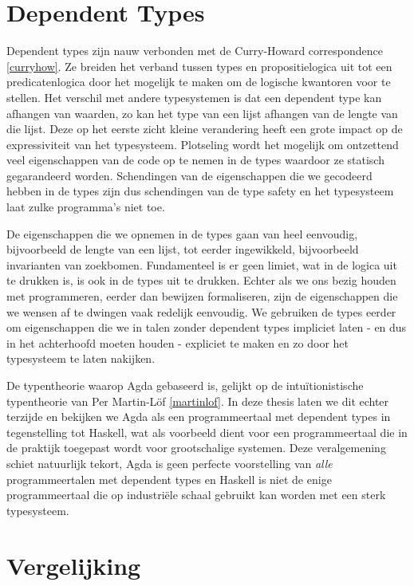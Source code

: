 \section{Dependent Types}

Dependent types zijn nauw verbonden met de Curry-Howard correspondence
\ref{curryhow}. Ze breiden het verband tussen types en propositielogica uit tot
een predicatenlogica door het mogelijk te maken om de logische kwantoren voor
te stellen. Het verschil met andere typesystemen is dat een dependent type kan
afhangen van waarden, zo kan het type van een lijst afhangen van de lengte van
die lijst. Deze op het eerste zicht kleine verandering heeft een grote impact
op de expressiviteit van het typesysteem. Plotseling wordt het mogelijk om
ontzettend veel eigenschappen van de code op te nemen in de types waardoor ze
statisch gegarandeerd worden. Schendingen van de eigenschappen die we gecodeerd
hebben in de types zijn dus schendingen van de type safety en het typesysteem
laat zulke programma's niet toe.

De eigenschappen die we opnemen in de types gaan van heel eenvoudig,
bijvoorbeeld de lengte van een lijst, tot eerder ingewikkeld, bijvoorbeeld
invarianten van zoekbomen. Fundamenteel is er geen limiet, wat in de logica uit
te drukken is, is ook in de types uit te drukken. Echter als we ons bezig
houden met programmeren, eerder dan bewijzen formaliseren, zijn de
eigenschappen die we wensen af te dwingen vaak redelijk eenvoudig. We gebruiken
de types eerder om eigenschappen die we in talen zonder dependent types
impliciet laten - en dus in het achterhoofd moeten houden - expliciet te maken
en zo door het typesysteem te laten nakijken.

De typentheorie waarop Agda gebaseerd is, gelijkt op de intuïtionistische
typentheorie van Per Martin-Löf \ref{martinlof}. In deze thesis laten we dit
echter terzijde en bekijken we Agda als een programmeertaal met dependent types
in tegenstelling tot Haskell, wat als voorbeeld dient voor een programmeertaal
die in de praktijk toegepast wordt voor grootschalige systemen. Deze
veralgemening schiet natuurlijk tekort, Agda is geen perfecte voorstelling van
\emph{alle} programmeertalen met dependent types en Haskell is niet de enige
programmeertaal die op industriële schaal gebruikt kan worden met een sterk
typesysteem.


\section{Vergelijking}

